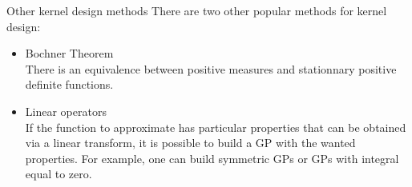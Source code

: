 \begin{frame}{Other kernel design methods}
There are two other popular methods for kernel design:
\begin{itemize}
    \item Bochner Theorem\\
There is an equivalence between positive measures and stationnary positive definite functions. 
    \item Linear operators\\
If the function to approximate has particular properties that can be obtained via a linear transform, it is possible to build a GP with the wanted properties. For example, one can build symmetric GPs or GPs with integral equal to zero.
\end{itemize}
\end{frame}
